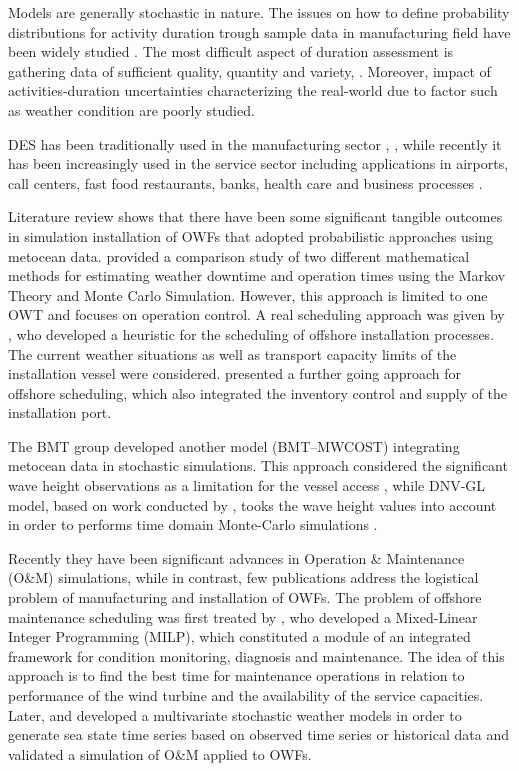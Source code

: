 Models are generally stochastic in nature. The issues on how to define probability distributions for activity duration trough sample data in manufacturing field have been widely studied \cite{Fente_2000, Maio2000, EJOR001}. The most difficult aspect of duration assessment is gathering data of sufficient quality, quantity and variety, \cite{Robinson_2014}. Moreover, impact of activities-duration uncertainties characterizing the real-world due to factor such as weather condition are poorly studied.

DES has been traditionally used in the manufacturing sector \cite{KhedriLiraviasl20151490}, \cite{Yeong2014}, while recently it has been increasingly used in the service sector including applications in airports, call centers, fast food restaurants, banks, health care \cite{Chemweno201445,Viana_2014} and business processes \cite{Khodyrev2014322}.

Literature review shows that there have been some significant tangible outcomes in simulation installation of OWFs that adopted probabilistic approaches using metocean data. \cite{Tyapin2011} provided a comparison study of two different mathematical methods for estimating weather downtime and operation times using the Markov Theory and Monte Carlo Simulation. However, this approach is limited to one OWT and focuses on operation control. A real scheduling approach was given by \cite{Scholz2010}, who developed a heuristic for the scheduling of offshore installation processes. The current weather situations as well as transport capacity limits of the installation vessel were considered. \cite{ISOPE2012} presented a further going approach for offshore scheduling, which also integrated the inventory control and supply of the installation port.

The BMT group developed another model (BMT--MWCOST) integrating metocean data in stochastic simulations. This approach considered the significant wave height observations as a limitation for the vessel access \cite{Stratford2007}, while DNV-GL model, based on work conducted by \cite{Bossanyi1992}, tooks the wave height values into account in order to performs time domain Monte-Carlo simulations \cite{philips2006evaluating}.

Recently they have been significant advances in Operation \& Maintenance (O\&M) simulations, while in contrast, few publications address the logistical problem of manufacturing and installation of OWFs. The problem of offshore maintenance scheduling was first treated by \cite{Kovacs2011497}, who developed a Mixed-Linear Integer Programming (MILP), which constituted a module of an integrated framework for condition monitoring, diagnosis and maintenance. The idea of this approach is to find the best time for maintenance operations in relation to performance of the wind turbine and the availability of the service capacities. Later, \cite{scheu2012} and \cite{Hagen2013} developed a multivariate stochastic weather models in order to generate sea state time series based on observed time series or historical data and validated a simulation of O\&M applied to OWFs.

